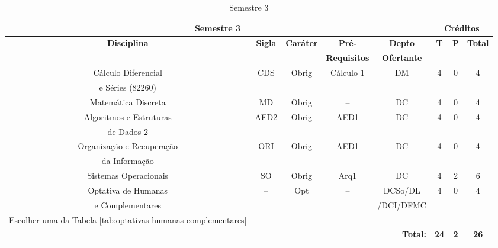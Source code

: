 \begin{table}[H]
\caption{Semestre 3}
\centering
\footnotesize
\begin{tabular}{|c|c|c|c|c|c|c|c|} %
\hline
\hline
\multicolumn{5}{|c|}{\textbf{Semestre 3}}  &  \multicolumn{3}{|c|}{\textbf{Créditos}} \\
\hline
\hline
\textbf{Disciplina} & \textbf{Sigla} & \textbf{Caráter} & \textbf{Pré-} & \textbf{Depto} &  \textbf{T}  &  \textbf{P}  & \textbf{Total} \\ 
& & & \textbf{Requisitos}  & \textbf{Ofertante} & & & \\
\hline 
Cálculo Diferencial & CDS & Obrig & Cálculo 1 & DM  & 4 & 0 & 4 \\
e Séries (82260) & & & & & & & \\
\hline
Matemática Discreta & MD & Obrig & -- & DC  & 4 & 0 & 4 \\
\hline
Algoritmos e Estruturas & AED2 & Obrig & AED1 & DC  & 4 & 0 & 4 \\
de Dados 2 & & & & & & & \\
\hline
Organização e Recuperação & ORI & Obrig & AED1 & DC  & 4 & 0 & 4 \\
da Informação & & & & & & & \\
\hline
Sistemas Operacionais & SO & Obrig & Arq1 & DC  & 4 & 2 & 6 \\
\hline
Optativa de Humanas & -- & Opt & -- & DCSo/DL & 4 & 0 & 4 \\
e Complementares & & & & /DCI/DFMC & & & \\
Escolher uma da Tabela \ref{tab:optativas-humanas-complementares} & & & & & & & \\
\hline

\hline
\hline
\multicolumn{5}{|r|}{\textbf{Total:}}  &  \textbf{24}  &  \textbf{2}   & \textbf{26} \\ %
\hline
\hline
\end{tabular}
\label{tab:matriz3}
\end{table}




